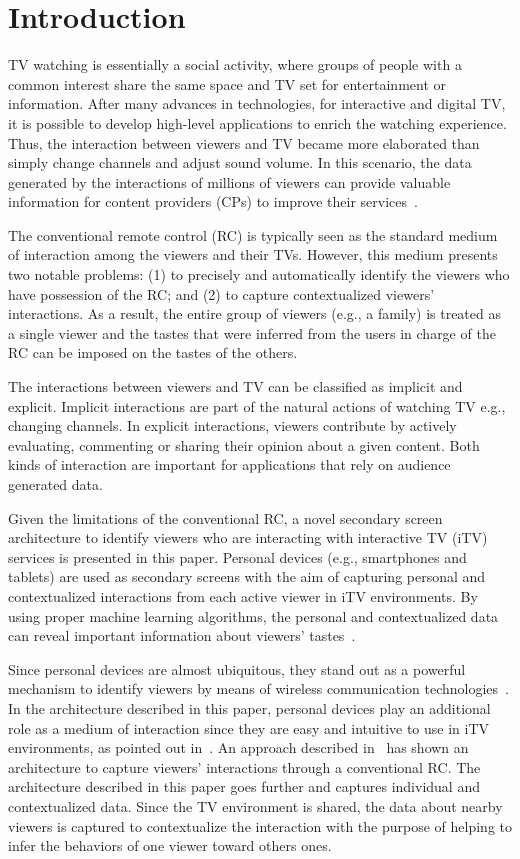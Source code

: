 \documentclass[journal]{IEEEtran}
\begin{document}
\section{Introduction}

TV watching is essentially a social activity, where groups of people with a common interest share the same space and TV set for entertainment or information. After many advances in technologies, for interactive and digital TV, it is possible to develop high-level applications to enrich the watching experience. Thus, the interaction between viewers and TV became more elaborated than simply change channels and adjust sound volume. In this scenario, the data generated by the interactions of millions of viewers can provide valuable information for content providers (CPs) to improve their services~\cite{Teixeira2010}.

The conventional remote control (RC) is typically seen as the standard medium of interaction among the viewers and their TVs. However, this medium presents two notable problems: (1) to precisely and automatically identify the viewers who have possession of the RC; and (2) to capture contextualized viewers' interactions. As a result, the entire group of viewers (e.g., a family) is treated as a single viewer and the tastes that were inferred from the users in charge of the RC can be imposed on the tastes of the others.

The interactions between viewers and TV can be classified as implicit and explicit. Implicit interactions are part of the natural actions of watching TV e.g., changing channels. In explicit interactions, viewers contribute by actively evaluating, commenting or sharing their opinion about a given content. Both kinds of interaction are important for applications that rely on audience generated data.

Given the limitations of the conventional RC, a novel secondary screen architecture to identify viewers who are interacting with interactive TV (iTV) services is presented in this paper. Personal devices (e.g., smartphones and tablets) are used as secondary screens with the aim of capturing personal and contextualized interactions from each active viewer in iTV environments. By using proper machine learning algorithms, the personal and contextualized data can reveal important information about viewers' tastes~\cite{Kim2012,Shin2009}. 

Since personal devices are almost ubiquitous, they stand out as a powerful mechanism to identify viewers by means of wireless communication technologies~\cite{Cabarcos2011}. In the architecture described in this paper, personal devices play an additional role as a medium of interaction since they are easy and intuitive to use in iTV environments, as pointed out in~\cite{Courtois2012}. An approach described in~\cite{Teixeira2010} has shown an architecture to capture viewers' interactions through a conventional RC. The architecture described in this paper goes further and captures individual and contextualized data. Since the TV environment is shared, the data about nearby viewers is captured to contextualize the interaction with the purpose of helping to infer the behaviors of one viewer toward others ones.
\end{document}
